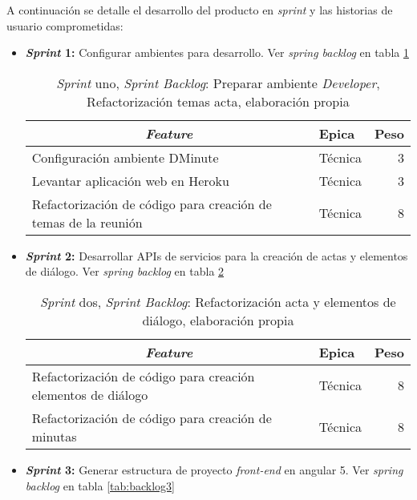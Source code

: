 A continuación se detalle el desarrollo del producto en \textit{sprint} y las historias de usuario comprometidas:

\begin{itemize}
	\item \textbf{\textit{Sprint} 1:} Configurar ambientes para desarrollo. Ver \textit{spring backlog} en tabla \ref{tab:backlog1}

\begin{table}[!h]
\centering
\caption{\textit{Sprint} uno, \textit{Sprint Backlog}: Preparar ambiente \textit{Developer}, Refactorización temas acta, elaboración propia}
\label{tab:backlog1}
\begin{tabular}{|l|l|r|}
\hline
\multicolumn{1}{|c|}{\textit{\textbf{Feature}}} & \textbf{Epica} & \textbf{Peso} \\ \hline
Configuración ambiente DMinute & Técnica & 3 \\ \hline
Levantar aplicación web en Heroku & Técnica & 3 \\ \hline
Refactorización de código para creación de temas de la reunión & Técnica & 8 \\ \hline
\end{tabular}
\end{table}

	\item \textbf{\textit{Sprint} 2:} Desarrollar APIs de servicios para la creación de actas y elementos de diálogo. Ver \textit{spring backlog} en tabla \ref{tab:backlog2}

\begin{table}[!h]
\centering
\caption{\textit{Sprint} dos, \textit{Sprint Backlog}: Refactorización acta y elementos de diálogo, elaboración propia}
\label{tab:backlog2}
\begin{tabular}{|l|l|r|}
\hline
\multicolumn{1}{|c|}{\textit{\textbf{Feature}}} & \textbf{Epica} & \textbf{Peso} \\ \hline
Refactorización de código para creación elementos de diálogo & Técnica & 8 \\ \hline
Refactorización de código para creación de minutas & Técnica & 8 \\ \hline
\end{tabular}
\end{table}

	\item \textbf{\textit{Sprint} 3:} Generar estructura de proyecto \textit{front-end} en angular 5. Ver \textit{spring backlog} en tabla \ref{tab:backlog3}


\end{itemize}
